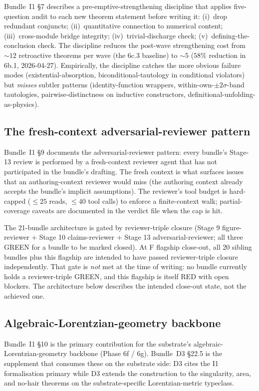 \documentclass[aps,prd,reprint,nofootinbib,superscriptaddress]{revtex4-2}
\begin{document}
Bundle~I1 \S 7 describes a pre-emptive-strengthening discipline that
applies five-question audit to each new theorem statement before
writing it: (i)~drop redundant conjuncts; (ii)~quantitative connection
to numerical content; (iii)~cross-module bridge integrity;
(iv)~trivial-discharge check; (v)~defining-the-conclusion check. The
discipline reduces the post-wave strengthening cost from $\sim 12$
retroactive theorems per wave (the 6c.3 baseline) to $\sim 5$
($58\%$ reduction in 6b.1, 2026-04-27). Empirically, the discipline
catches the more obvious failure modes (existential-absorption,
biconditional-tautology in conditional violators) but \emph{misses}
subtler patterns (identity-function wrappers,
within-own-$\pm 2\sigma$-band tautologies, pairwise-distinctness on
inductive constructors, definitional-unfolding-as-physics).

\subsection{The fresh-context adversarial-reviewer pattern}

Bundle~I1 \S 9 documents the adversarial-reviewer pattern: every
bundle's Stage-13 review is performed by a fresh-context reviewer
agent that has not participated in the bundle's drafting. The fresh
context is what surfaces issues that an authoring-context reviewer
would miss (the authoring context already accepts the bundle's
implicit assumptions). The reviewer's tool budget is hard-capped
($\le 25$ reads, $\le 40$ tool calls) to enforce a finite-context
walk; partial-coverage caveats are documented in the verdict file
when the cap is hit.

The 21-bundle architecture is gated by reviewer-triple closure (Stage
9 figure-reviewer + Stage 10 claims-reviewer + Stage 13
adversarial-reviewer; all three GREEN for a bundle to be marked
closed). At F flagship close-out, all 20 sibling bundles plus this
flagship are intended to have passed reviewer-triple closure
independently. That gate is \emph{not} met at the time of writing:
no bundle currently holds a reviewer-triple GREEN, and this flagship
is itself RED with open blockers. The architecture below describes
the intended close-out state, not the achieved one.

\subsection{Algebraic-Lorentzian-geometry backbone}

Bundle~I1 \S 10 is the primary contribution for the
substrate's algebraic-Lorentzian-geometry backbone (Phase 6f / 6g).
Bundle~D3 \S 22.5 is the supplement that consumes these on the
substrate side: D3 cites the I1 formalisation primary while
D3 extends the construction to the singularity, area, and no-hair
theorems on the substrate-specific Lorentzian-metric typeclass.
\end{document}
